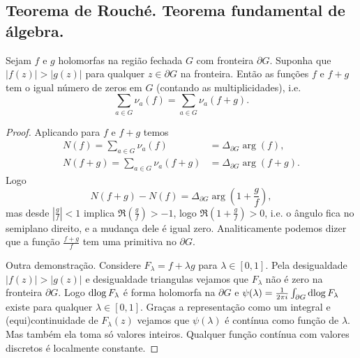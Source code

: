 \subsection{Teorema de Rouché. Teorema fundamental de álgebra.}

\begin{teorema}[Rouché]
\label{t:rouche}
Sejam $f$ e $g$ holomorfas na região fechada $G$ com fronteira $\partial G$.
Suponha que $|f(z)| > |g(z)|$ para qualquer $z\in\partial G$ na fronteira.
Então as funções $f$ e $f+g$ tem o igual número de zeros em $G$ (contando as multiplicidades), i.e.
\[ \sum_{a\in G} \nu_a(f) = \sum_{a\in G} \nu_a(f+g) .\]
\end{teorema}
\begin{proof}
Aplicando  para $f$ e $f+g$ temos
\begin{align*}
N(f) = \sum_{a\in G} \nu_a(f)   &= \Delta_{\partial G} \arg(f),\\
N(f+g) =\sum_{a\in G} \nu_a(f+g) &= \Delta_{\partial G} \arg(f+g).
\end{align*}
Logo
\[ N(f+g)-N(f) = \Delta_{\partial G} \arg(1+\frac{g}{f}), \]
mas desde $|\frac{g}{f}| < 1$ implica $\Re(\frac{g}{f})>-1$,
logo $\Re(1+\frac{g}{f}) > 0$, i.e. o ângulo fica no semiplano direito,
e a mudança dele é igual zero. Analiticamente podemos dizer que a função $\frac{f+g}{f}$
tem uma primitiva no $\partial G$.

Outra demonstração. Considere $F_\lambda = f + \lambda g$ para $\lambda\in[0,1]$.
Pela desigualdade $|f(z)| > |g(z)|$ e desigualdade triangulas
vejamos que $F_\lambda$ não é zero na fronteira $\partial G$.
Logo $\operatorname{dlog} F_\lambda$ é forma holomorfa na $\partial G$
e $\psi(\lambda) = \frac{1}{2\pi i} \int_{\partial G} \operatorname{dlog} F_\lambda$ existe para qualquer $\lambda\in[0,1]$.
Graças a representação como um integral e (equi)continuidade de $F_\lambda(z)$
vejamos que $\psi(\lambda)$ é contínua como função de $\lambda$. Mas também ela toma só valores inteiros.
Qualquer função contínua com valores discretos é localmente constante.
\end{proof}

